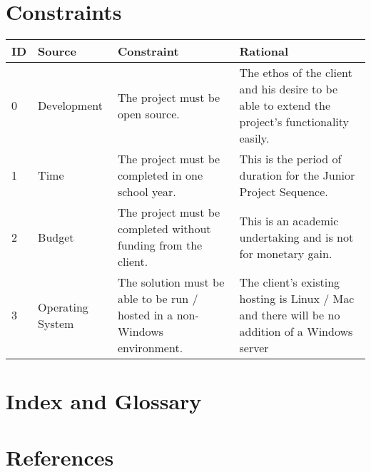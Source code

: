 \documentclass{article}
\begin{document}
\section{Constraints}
\begin{tabular}{ | p{0.25in} | p{1.15in} | p{2.3in} | p{2.3in} | }
\hline
\textbf{ID} & \textbf{Source} & \textbf{Constraint} & \textbf{Rational}\\
\hline
\hline
0 & Development & The project must be open source. & The ethos of the client and his desire to be able to extend the project's functionality easily.\\
\hline
1 & Time & The project must be completed in one school year. & This is the period of duration for the Junior Project Sequence.\\
\hline
2 & Budget & The project must be completed without funding from the client. & This is an academic undertaking and is not for monetary gain.\\
\hline
3 & Operating System & The solution must be able to be run / hosted in a non-Windows environment. & The client's existing hosting is Linux / Mac and there will be no addition of a Windows server\\
\hline
\end{tabular}

\section{Index and Glossary}

\section{References}
\end{document}
